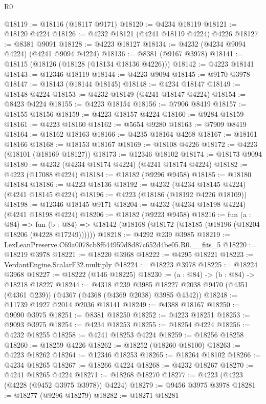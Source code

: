 \begin{lexlean}{R0}
\begin{coremodule}
@18119 := @18116 (@18117 @9171)
@18120 := @4234 @18119
@18121 := @18120 @4224
@18126 := @4232 @18121 (@4241 @18119 @4224) @4226
@18127 := @8381 @9091
@18128 := @4223 @18127
@18134 := @4232 (@4234 @9094 @4224) (@4241 @9094 @4224)
@18136 := @8381 (@9167 @3978)
@18141 := @18115 (@18126 (@18128 (@18134 @18136 @4226)))
@18142 := @4223 @18141
@18143 := @12346 @18119
@18144 := @4223 @9094
@18145 := @9170 @3978
@18147 := @18143 (@18144 @18145)
@18148 := @4234 @18147
@18149 := @18148 @4224
@18153 := @4232 @18149 (@4241 @18147 @4224)
@18154 := @8423 @4224
@18155 := @4223 @18154
@18156 := @7906 @8419
@18157 := @18155 @18156
@18159 := @4223 @18157 @4224
@18160 := @9284 @18159
@18161 := @4223 @18160
@18162 := @5654 @9280
@18163 := @7909 @8419
@18164 := @18162 @18163
@18166 := @4235 @18164 @4268
@18167 := @18161 @18166
@18168 := @18153 @18167
@18169 := @18108 @4226
@18172 := @4223 (@18101 (@18169 @18127))
@18173 := @12346 @18102
@18174 := @18173 @9094
@18180 := @4232 (@4234 @18174 @4224) (@4241 @18174 @4224)
@18182 := @4223 (@17088 @4224)
@18184 := @18182 (@9296 @9458)
@18185 := @18180 @18184
@18186 := @4223 @18136
@18192 := @4232 (@4234 @18145 @4224) (@4241 @18145 @4224)
@18196 := @4223 (@18186 (@18192 @4226 @18109))
@18198 := @12346 @18145 @9171
@18204 := @4232 (@4234 @18198 @4224) (@4241 @18198 @4224)
@18206 := @18182 (@9223 @9458)
@18216 := fun (a : @84) =>
  fun (b : @84) => @18142 (@18168 (@18172 (@18185 (@18196 (@18204 @18206 (@4228 @17249))))))
@18218 := @4292 @239 @3985
@18219 := LexLeanPreserve.C69a0078cb8f644959d8d87c652d4be05.R0.__fits_5
@18220 := @18219 @3978
@18221 := @18220 @3968
@18222 := @4295 @18221
@18223 := VerdantEngine.ScalarF32.multiply
@18224 := @18223 @3978
@18225 := @18224 @3968
@18227 := @18222 (@146 @18225)
@18230 := (a : @84) -> (b : @84) -> @18218 @18227
@18244 := @4318
    @239
    @3985
    @18227
    @2038
    @9470
    (@4351 (@4361 @239))
    (@4367 (@4368 (@4369 @2038) @3985 @4342))
@18248 := @11739 @1927 @2014 @2036 @18141
@18249 := @4388 @18167
@18250 := @9090 @3975
@18251 := @8381 @18250
@18252 := @4223 @18251
@18253 := @9093 @3975
@18254 := @4234 @18253
@18255 := @18254 @4224
@18256 := @4232 @18255
@18258 := @4241 @18253 @4224
@18259 := @18256 @18258
@18260 := @18259 @4226
@18262 := @18252 (@18260 @18100)
@18263 := @4223 @18262
@18264 := @12346 @18253
@18265 := @18264 @18102
@18266 := @4234 @18265
@18267 := @18266 @4224
@18268 := @4232 @18267
@18270 := @4241 @18265 @4224
@18271 := @18268 @18270
@18277 := @4223 (@4223 (@4228 (@9452 @3975 @3978)) @4224)
@18279 := @9456 @3975 @3978
@18281 := @18277 (@9296 @18279)
@18282 := @18271 @18281

\end{coremodule}
\end{lexlean}
